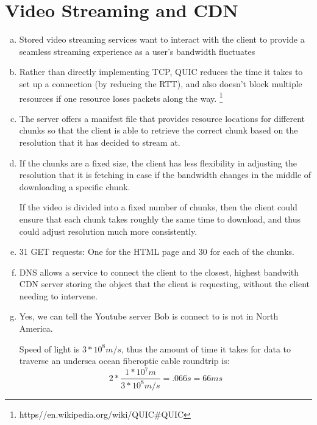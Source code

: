 \documentclass[11pt]{article}
\begin{document}
\section*{Video Streaming and CDN}
  \begin{enumerate}[(a)]
    \item
      Stored video streaming services want to interact with the client to provide
      a seamless streaming experience as a user's bandwidth fluctuates
    \item
      Rather than directly implementing TCP, QUIC reduces the time it takes
      to set up a connection (by reducing the RTT), and also doesn't
      block multiple resources if one resource loses packets along the way.
      \footnote{https\://en.wikipedia.org/wiki/QUIC\#QUIC}
    \item
      The server offers a manifest file that provides resource locations for
      different chunks so that the client is able to retrieve the correct chunk
      based on the resolution that it has decided to stream at.
    \item
      If the chunks are a fixed size, the client has less flexibility in
      adjusting the resolution that it is fetching in case if the bandwidth changes
      in the middle of downloading a specific chunk.

      If the video is divided into a fixed number of chunks, then the client could ensure that each chunk takes roughly the same time to download, and thus could
      adjust resolution much more consistently.
    \item
      31 GET requests: One for the HTML page and 30 for each of the chunks.
    \item
      DNS allows a service to connect the client to the closest, highest bandwith
      CDN server storing the object that the client is requesting, without the client
      needing to intervene.
    \item
      Yes, we can tell the Youtube server Bob is connect to is not in North America.

      Speed of light is $3 * 10^8 m/s$, thus the amount of time it takes for data
      to traverse an undersea ocean fiberoptic cable roundtrip is:
      \[ 2 * \frac{1 * 10^7 m}{3 * 10^8 m/s} = .066 s = 66 ms \]


\end{enumerate}
\end{document}
